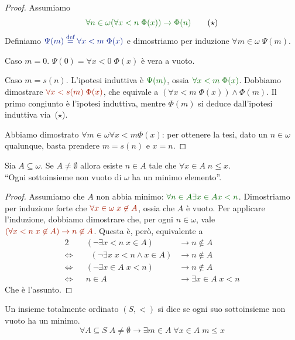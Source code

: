 \begin{proof}
Assumiamo
\[ {\drkgrn \forall {n \in \omega} (\forall {x < n} \; \Phi (x)) \rightarrow
\Phi(n)} \tag{$\star$} \]
	Definiamo $\drkblu \Psi(m) \Mydef \forall x < m \; \Phi(x)$ e
dimostriamo per induzione $\forall {m \in \omega} \; \Psi(m)$.

{\drkred Caso $m=0$.} $\Psi(0) = \forall x < 0 \; \Phi(x)$ \`e vera a
vuoto.

{\drkred Caso $m = s(n)$.} L'ipotesi induttiva \`e $\drkgrn\Psi(m)$, ossia
$\drkgrn\forall x < m \; \Phi(x)$. Dobbiamo dimostrare $\drkred\forall {x <
s(m)}\; \Phi(x)$, che equivale a $\left(\forall {x<m}\;
\Phi(x)\right)\land\Phi(m)$. Il primo congiunto \`e l'ipotesi induttiva,
mentre $\Phi(m)$ si deduce dall'ipotesi induttiva via~($\star$).

Abbiamo dimostrato $\forall {m \in \omega} \forall {x<m} \Phi(x)$: per
ottenere la tesi, dato un
$n\in\omega$ qualunque, basta prendere $m=s(n)$ e $x=n$.
\end{proof}

\begin{theorem}
	Sia $A \subseteq \omega$. Se $A \ne \emptyset$ allora esiste $n
\in A$ tale che $\forall x \in A \; n \leq x$.\\
{\drkgrn ``Ogni sottoinsieme non vuoto di $\omega$ ha un minimo
elemento''.}
\end{theorem}

\begin{proof}
	Assumiamo che $A$ non abbia minimo: $\drkgrn \forall {n\in A}\exists {x
\in A} x < n$. Dimostriamo per induzione forte che $\drkred \forall
x\in\omega\;x\not\in A$, ossia che $A$ \`e vuoto. Per applicare l'induzione,
dobbiamo dimostrare che, per ogni $n\in\omega$, vale $\drkred (\forall {x<n}\;x\not\in A)\rightarrow n\not\in
A$. Questa \`e, per\`o, equivalente a
	\begin{alignat*}{2}
&&(\neg\exists {x < n} \; x \in A) &\to n \not \in A \\
\iff&&\;\; (\neg\exists x \; x < n \land x \in A) &\to n \not \in A \\
\iff&& (\neg\exists {x \in A} \; x < n) &\to n \not \in A \\
\iff&& n \in A &\to \exists {x \in A} \; x < n
	\end{alignat*}
Che \`e l'assunto.
\end{proof}

\begin{definition}\label{def-ben-ord}
	Un insieme totalmente ordinato $(S, <)$ si dice  se ogni suo sottoinsieme non vuoto ha un minimo.
	\[ \forall {A \subseteq S} \; A \ne \emptyset \rightarrow \exists
{m \in A} \; \forall {x \in A} \; m \leq x
		\]
\end{definition}

